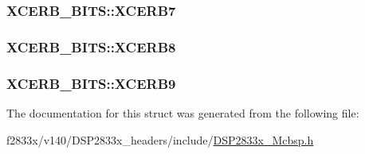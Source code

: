 \subsubsection[{X\+C\+E\+R\+B7}]{ X\+C\+E\+R\+B\+\_\+\+B\+I\+T\+S\+::\+X\+C\+E\+R\+B7}\label{struct_x_c_e_r_b___b_i_t_s_a52f60f71d6b8d3150c2198c8333f8282}
\hypertarget{struct_x_c_e_r_b___b_i_t_s_ab40f91b1c91a65f279b39036a5151668}{}
\subsubsection[{X\+C\+E\+R\+B8}]{ X\+C\+E\+R\+B\+\_\+\+B\+I\+T\+S\+::\+X\+C\+E\+R\+B8}\label{struct_x_c_e_r_b___b_i_t_s_ab40f91b1c91a65f279b39036a5151668}
\hypertarget{struct_x_c_e_r_b___b_i_t_s_ae2aedd9e21343c3eaa8a431117c8a02a}{}
\subsubsection[{X\+C\+E\+R\+B9}]{ X\+C\+E\+R\+B\+\_\+\+B\+I\+T\+S\+::\+X\+C\+E\+R\+B9}\label{struct_x_c_e_r_b___b_i_t_s_ae2aedd9e21343c3eaa8a431117c8a02a}


The documentation for this struct was generated from the following file\+:\begin{DoxyCompactItemize}
\item 
f2833x/v140/\+D\+S\+P2833x\+\_\+headers/include/\hyperlink{_d_s_p2833x___mcbsp_8h}{D\+S\+P2833x\+\_\+\+Mcbsp.\+h}\end{DoxyCompactItemize}
